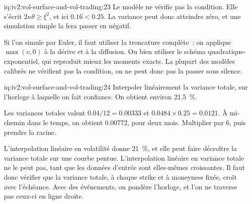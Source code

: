 \begin{solution}{iq:iv2:vol-surface-and-vol-trading:23}
Le modèle ne vérifie pas la condition. Elle s'écrit $2\kappa\theta \geq \xi^2$, et ici $0.16 < 0.25$. La variance peut donc atteindre zéro, et une simulation simple la fera passer en négatif.

Si l'on simule par Euler, il faut utiliser la troncature complète~: on applique $\max(v, 0)$ à la dérive et à la diffusion. Ou bien utiliser le schéma quadratique-exponentiel, qui reproduit mieux les moments exacts. La plupart des modèles calibrés ne vérifient pas la condition, on ne peut donc pas la passer sous silence.

\end{solution}

\begin{solution}{iq:iv2:vol-surface-and-vol-trading:24}
Interpoler linéairement la variance totale, sur l'horloge à laquelle on fait confiance. On obtient environ 21.5~\%.

Les variances totales valent $0.04/12 = 0.00333$ et $0.0484 \times 0.25 = 0.0121$. À mi-chemin dans le temps, on obtient 0.00772, pour deux mois. Multiplier par 6, puis prendre la racine.

L'interpolation linéaire en volatilité donne 21~\%, et elle peut faire décroître la variance totale sur une courbe pentue. L'interpolation linéaire en variance totale ne le peut pas, tant que les données d'entrée sont elles-mêmes croissantes. Il faut donc vérifier que la variance totale, à chaque strike et à moneyness fixée, croît avec l'échéance. Avec des événements, on pondère l'horloge, et l'on ne traverse pas ceux-ci en ligne droite.

\end{solution}

